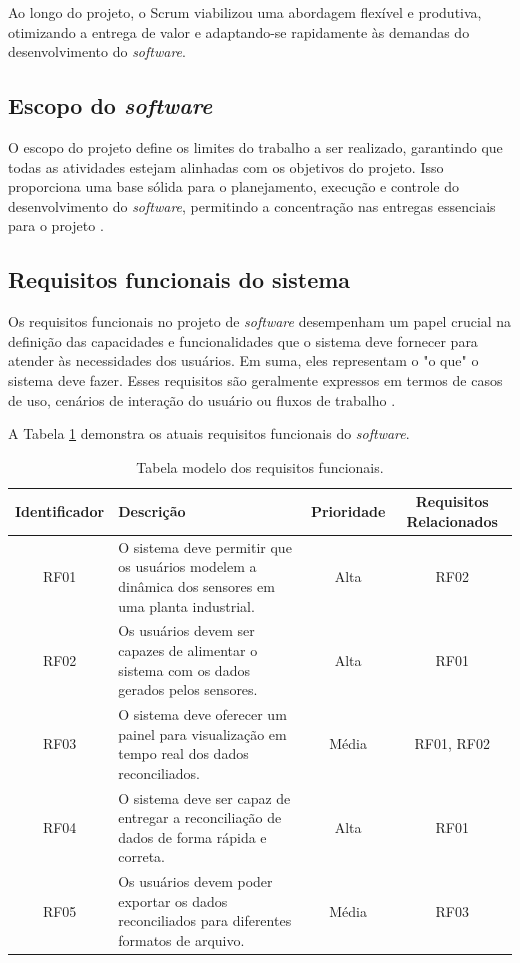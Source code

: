 Ao longo do projeto, o Scrum viabilizou uma abordagem flexível e produtiva, otimizando a entrega de valor e adaptando-se rapidamente às demandas do desenvolvimento do \textit{software}.

\subsection{Escopo do \textit{software}}

O escopo do projeto define os limites do trabalho a ser realizado, garantindo que todas as atividades estejam alinhadas com os objetivos do projeto. Isso proporciona uma base sólida para o planejamento, execução e controle do desenvolvimento do \textit{software}, permitindo a concentração nas entregas essenciais para o projeto \cite{softwareeng}.

\subsection{Requisitos funcionais do sistema}

Os requisitos funcionais no projeto de \textit{software} desempenham um papel crucial na definição das capacidades e funcionalidades que o sistema deve fornecer para atender às necessidades dos usuários. Em suma, eles representam o "o que" o sistema deve fazer. Esses requisitos são geralmente expressos em termos de casos de uso, cenários de interação do usuário ou fluxos de trabalho \cite{softwareengreq}.
        
A Tabela \ref{tab:req_funcional} demonstra os atuais requisitos funcionais do \textit{software}.

\begin{table}[htbp]
\centering
\begin{tabularx}{\linewidth}{|c|X|c|c|} \hline
\rowcolor[HTML]{C0C0C0} 
\textbf{Identificador} & \textbf{Descrição} & \textbf{Prioridade} & \textbf{Requisitos Relacionados} \\ \hline
RF01 & O sistema deve permitir que os usuários modelem a dinâmica dos sensores em uma planta industrial. & Alta & RF02 \\ \hline
RF02 & Os usuários devem ser capazes de alimentar o sistema com os dados gerados pelos sensores. & Alta & RF01 \\ \hline
RF03 & O sistema deve oferecer um painel para visualização em tempo real dos dados reconciliados. & Média & RF01, RF02 \\ \hline
RF04 & O sistema deve ser capaz de entregar a reconciliação de dados de forma rápida e correta. & Alta & RF01 \\ \hline
RF05 & Os usuários devem poder exportar os dados reconciliados para diferentes formatos de arquivo. & Média & RF03 \\ \hline
\end{tabularx}

\caption{Tabela modelo dos requisitos funcionais.}
\label{tab:req_funcional}
\end{table}

